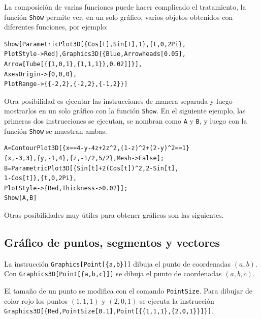       La composición de varias funciones puede hacer complicado
      el tratamiento, la función \verb"Show" permite ver, en un solo gráfico, varios objetos obtenidos con
      diferentes funciones, por ejemplo: 
      \begin{tcolorbox}[title=Uso de la función \verb"Show"]
\begin{Verbatim}
Show[ParametricPlot3D[{Cos[t],Sin[t],1},{t,0,2Pi},
PlotStyle->Red],Graphics3D[{Blue,Arrowheads[0.05],
Arrow[Tube[{{1,0,1},{1,1,1}},0.02]]}],
AxesOrigin->{0,0,0},
PlotRange->{{-2,2},{-2,2},{-1,2}}]
\end{Verbatim}
      \end{tcolorbox}
      Otra posibilidad es ejecutar las instrucciones de manera separada y luego mostrarlos en un solo
      gráfico con la función \verb"Show". En el siguiente ejemplo, las primeras dos instrucciones se ejecutan,
      se nombran como \verb"A" y \verb"B", y luego con la función \verb"Show" se muestran ambas.%
      \begin{tcolorbox}[title=Ejecución de gráficos por separado]
\begin{Verbatim}
A=ContourPlot3D[{x==4-y-4z+2z^2,(1-z)^2+(2-y)^2==1}
{x,-3,3},{y,-1,4},{z,-1/2,5/2},Mesh->False];
B=ParametricPlot3D[{Sin[t]+2(Cos[t])^2,2-Sin[t],
1-Cos[t]},{t,0,2Pi},
PlotStyle->{Red,Thickness->0.02}];
Show[A,B]
\end{Verbatim}
      \end{tcolorbox}
      Otras posibilidades muy útiles para obtener gráficos son las siguientes.

      \subsection{Gráfico de puntos, segmentos y vectores}

      \begin{tcolorbox}[title=Gráfico de puntos]
        La instrucción \verb"Graphics[Point[{a,b}]]" dibuja el punto de
        coordenadas $\left(a,b\right)$. Con \verb"Graphics3D[Point[{a,b,c}]]" se dibuja el
        punto de coordenadas $\left(a,b,c\right) $.
      \end{tcolorbox}
      El tamaño de un punto se modifica con el comando \verb"PointSize". 
      Para dibujar de color rojo los puntos $\left( 1,1,1\right) $ y $\left( 2,0,1\right)$
      se ejecuta la instrucción \verb"Graphics3D[{Red,PointSize[0.1],Point[{{1,1,1},{2,0,1}}]}]".

